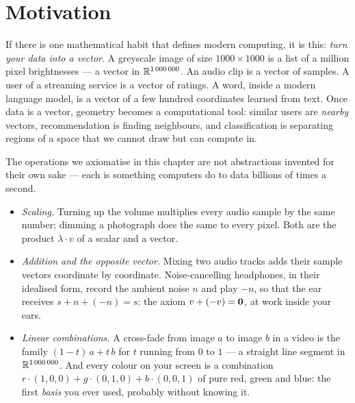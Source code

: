 \section{Motivation}

If there is one mathematical habit that defines modern computing, it is this: \emph{turn your data into a
vector}. A greyscale image of size $1000\times 1000$ is a list of a million pixel brightnesses — a vector
in $\mathbb{R}^{1\,000\,000}$. An audio clip is a vector of samples. A user of a streaming service is a vector of
ratings. A word, inside a modern language model, is a vector of a few hundred coordinates learned from
text. Once data is a vector, geometry becomes a computational tool: similar users are \emph{nearby}
vectors, recommendation is finding neighbours, and classification is separating regions of a space that we
cannot draw but can compute in.

The operations we axiomatise in this chapter are not abstractions invented for their own sake — each is
something computers do to data billions of times a second.
\begin{itemize}
\item \emph{Scaling.} Turning up the volume multiplies every audio sample by the same number; dimming a
photograph does the same to every pixel. Both are the product $\lambda\cdot v$ of a scalar and a vector.
\item \emph{Addition and the opposite vector.} Mixing two audio tracks adds their sample vectors
coordinate by coordinate. Noise-cancelling headphones, in their idealised form, record the ambient noise
$n$ and play $-n$, so that the ear receives $s + n + (-n) = s$: the axiom $v + (-v) = \mathbf{0}$, at work inside
your ears.
\item \emph{Linear combinations.} A cross-fade from image $a$ to image $b$ in a video is the family
$(1-t)\,a + t\,b$ for $t$ running from $0$ to $1$ — a straight line segment in $\mathbb{R}^{1\,000\,000}$.
And every colour on your screen is a combination $r\cdot(1,0,0) + g\cdot(0,1,0) + b\cdot(0,0,1)$ of pure
red, green and blue: the first \emph{basis} you ever used, probably without knowing it.
\end{itemize}

